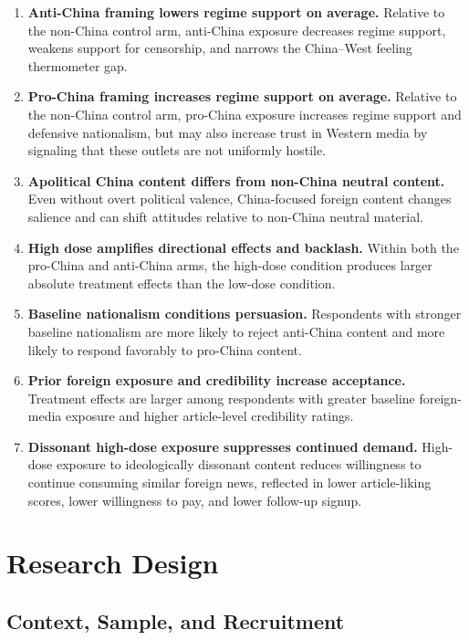 \documentclass[12pt,american]{article}
\begin{document}
\begin{enumerate}[label=\textbf{H\arabic*.}, leftmargin=1.5em]
\item \textbf{Anti-China framing lowers regime support on average.} Relative to the non-China control arm, anti-China exposure decreases regime support, weakens support for censorship, and narrows the China--West feeling thermometer gap.
\item \textbf{Pro-China framing increases regime support on average.} Relative to the non-China control arm, pro-China exposure increases regime support and defensive nationalism, but may also increase trust in Western media by signaling that these outlets are not uniformly hostile.
\item \textbf{Apolitical China content differs from non-China neutral content.} Even without overt political valence, China-focused foreign content changes salience and can shift attitudes relative to non-China neutral material.
\item \textbf{High dose amplifies directional effects and backlash.} Within both the pro-China and anti-China arms, the high-dose condition produces larger absolute treatment effects than the low-dose condition.
\item \textbf{Baseline nationalism conditions persuasion.} Respondents with stronger baseline nationalism are more likely to reject anti-China content and more likely to respond favorably to pro-China content.
\item \textbf{Prior foreign exposure and credibility increase acceptance.} Treatment effects are larger among respondents with greater baseline foreign-media exposure and higher article-level credibility ratings.
\item \textbf{Dissonant high-dose exposure suppresses continued demand.} High-dose exposure to ideologically dissonant content reduces willingness to continue consuming similar foreign news, reflected in lower article-liking scores, lower willingness to pay, and lower follow-up signup.
\end{enumerate}

\section{Research Design}

\subsection{Context, Sample, and Recruitment}
\end{document}
